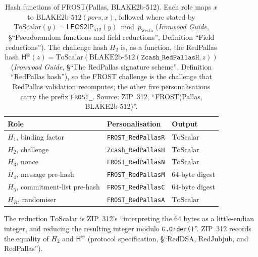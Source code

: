 \documentclass[11pt,a4paper]{article}
\theoremstyle{definition}
\newcommand{\Vesta}{\ensuremath{\mathsf{Vesta}}}
\begin{document}
\begin{table}[t]
\centering
\begin{tabular}{@{}lll@{}}
\toprule
Role & Personalisation & Output \\
\midrule
\(H_1\), binding factor & \texttt{FROST\_RedPallasR} & \(\mathrm{ToScalar}\) \\
\(H_2\), challenge & \texttt{Zcash\_RedPallasH} & \(\mathrm{ToScalar}\) \\
\(H_3\), nonce & \texttt{FROST\_RedPallasN} & \(\mathrm{ToScalar}\) \\
\(H_4\), message pre-hash & \texttt{FROST\_RedPallasM} & \(64\)-byte digest \\
\(H_5\), commitment-list pre-hash & \texttt{FROST\_RedPallasC}
  & \(64\)-byte digest \\
\(H_R\), randomiser & \texttt{FROST\_RedPallasA} & \(\mathrm{ToScalar}\) \\
\bottomrule
\end{tabular}
\caption{Hash functions of FROST(Pallas, BLAKE2b-512). Each role maps \(x\)
to \(\mathrm{BLAKE2b\text{-}512}(\mathit{pers}, x)\), followed where stated
by \(\mathrm{ToScalar}(y) = \mathsf{LEOS2IP}_{512}(y) \bmod p_{\Vesta}\)
(\emph{Ironwood Guide}, \S``Pseudorandom functions and field reductions'',
Definition ``Field reductions''). The challenge hash \(H_2\) is, as a
function, the RedPallas hash \(\mathsf{H}^{\circledast}(z) =
\mathrm{ToScalar}(\mathrm{BLAKE2b\text{-}512}(\texttt{Zcash\_RedPallasH},
z))\) (\emph{Ironwood Guide}, \S``The RedPallas signature scheme'', Definition
``RedPallas hash''), so the FROST challenge is the challenge that RedPallas
validation recomputes; the other five personalisations carry the prefix
\texttt{FROST\_}. Source: ZIP~312, ``FROST(Pallas, BLAKE2b-512)''.}
\label{tab:pallas-hashes}
\end{table}

The reduction \(\mathrm{ToScalar}\) is ZIP~312's ``interpreting the 64 bytes
as a little-endian integer, and reducing the resulting integer modulo
\texttt{G.Order()}''. ZIP~312 records the equality of \(H_2\) and
\(\mathsf{H}^{\circledast}\) (protocol specification, \S``RedDSA, RedJubjub,
and RedPallas'').
\end{document}
